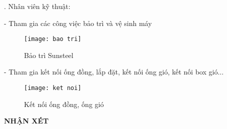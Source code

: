 \documentclass[12pt,a4paper]{article}
\newcommand{\Pointilles}[1]{%
  \par\nobreak
  \noindent\rule{0pt}{1.5\baselineskip} 
  \multido{}{#1}{\noindent\makebox[\linewidth]{\dotfill}\endgraf}
  \bigskip
}
\begin{document}
\begin{enumerate}
. Nhân viên kỹ thuật:

\hspace{1cm} - Tham gia các công việc bảo trì và vệ sinh máy
\begin{figure}[htbp]
  \centering
  \texttt{[image: bao tri]}
  \caption{Bảo trì Sunsteel }
\end{figure}

\hspace{1cm} - Tham gia kết nối ống đồng, lắp đặt, kết nối ống gió, kết nối box gió...
\begin{figure}[H]
  \centering
  \texttt{[image: ket noi]}
  \caption{Kết nối ống đồng, ống gió }
\end{figure}

\end{enumerate}

\newpage
\begin{center}
  {\Huge \textbf{NHẬN XÉT }}
\end{center}
\Pointilles{44}
\end{document}
